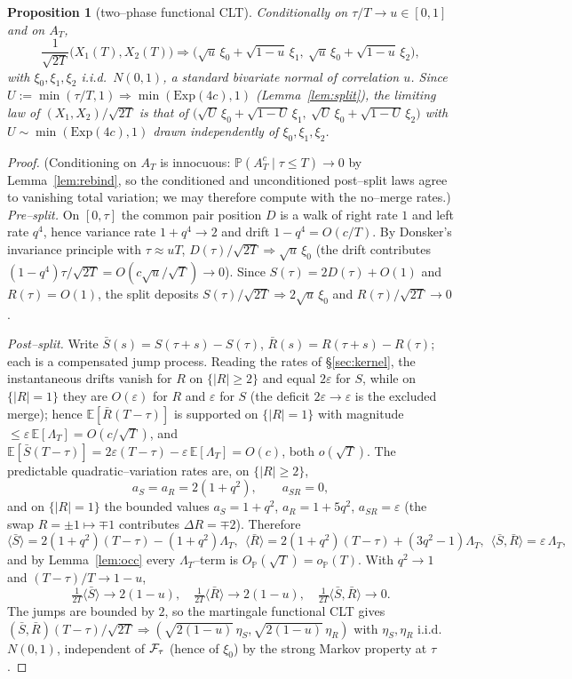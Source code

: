 \documentclass[11pt]{article}
\theoremstyle{plain}
\newtheorem{proposition}[theorem]{Proposition}
\theoremstyle{definition}
\theoremstyle{remark}
\newcommand{\E}{\mathbb{E}}\newcommand{\PP}{\mathbb{P}}\newcommand{\dd}{\,\mathrm{d}}
\newcommand{\To}{\Rightarrow}\newcommand{\so}{\mathfrak{so}}
\newcommand{\eps}{\varepsilon}\newcommand{\Exp}{\mathrm{Exp}}
\begin{document}
\begin{proposition}[two--phase functional CLT]\label{prop:twophase}
Conditionally on $\tau/T\to u\in[0,1]$ and on $A_T$,
\[
  \frac1{\sqrt{2T}}\big(X_1(T),X_2(T)\big)\To
  \big(\sqrt u\,\xi_0+\sqrt{1-u}\,\xi_1,\ \sqrt u\,\xi_0+\sqrt{1-u}\,\xi_2\big),
\]
with $\xi_0,\xi_1,\xi_2$ i.i.d.\ $N(0,1)$, a standard bivariate normal of correlation $u$.
Since $U:=\min(\tau/T,1)\To\min(\Exp(4c),1)$ (Lemma~\ref{lem:split}), the limiting law of
$(X_1,X_2)/\sqrt{2T}$ is that of
$\big(\sqrt U\,\xi_0+\sqrt{1-U}\,\xi_1,\ \sqrt U\,\xi_0+\sqrt{1-U}\,\xi_2\big)$ with
$U\sim\min(\Exp(4c),1)$ drawn independently of $\xi_0,\xi_1,\xi_2$.
\end{proposition}
\begin{proof}
(Conditioning on $A_T$ is innocuous: $\PP(A_T^c\mid\tau\le T)\to0$ by
Lemma~\ref{lem:rebind}, so the conditioned and unconditioned post--split laws agree
to vanishing total variation; we may therefore compute with the no--merge rates.)
\emph{Pre--split.} On $[0,\tau]$ the common pair position $D$ is a walk of right rate
$1$ and left rate $q^4$, hence variance rate $1+q^4\to2$ and drift $1-q^4=O(c/T)$. By
Donsker's invariance principle with $\tau\approx uT$, $D(\tau)/\sqrt{2T}\To\sqrt u\,\xi_0$
(the drift contributes $(1-q^4)\tau/\sqrt{2T}=O(c\sqrt u/\sqrt T)\to0$). Since
$S(\tau)=2D(\tau)+O(1)$ and $R(\tau)=O(1)$, the split deposits
$S(\tau)/\sqrt{2T}\To2\sqrt u\,\xi_0$ and $R(\tau)/\sqrt{2T}\to0$.

\emph{Post--split.} Write $\bar S(s)=S(\tau{+}s)-S(\tau)$, $\bar R(s)=R(\tau{+}s)-R(\tau)$;
each is a compensated jump process. Reading the rates of \S\ref{sec:kernel}, the
instantaneous drifts vanish for $R$ on $\{|R|\ge2\}$ and equal $2\eps$ for $S$, while on
$\{|R|=1\}$ they are $O(\eps)$ for $R$ and $\eps$ for $S$ (the deficit $2\eps\to\eps$ is
the excluded merge); hence $\E[\bar R(T{-}\tau)]$ is supported on $\{|R|=1\}$ with
magnitude $\le\eps\,\E[\Lambda_T]=O(c/\sqrt T)$, and
$\E[\bar S(T{-}\tau)]=2\eps(T{-}\tau)-\eps\,\E[\Lambda_T]=O(c)$, both $o(\sqrt T)$. The
predictable quadratic--variation rates are, on $\{|R|\ge2\}$,
\[
  a_S=a_R=2(1+q^2),\qquad a_{SR}=0,
\]
and on $\{|R|=1\}$ the bounded values $a_S=1+q^2$, $a_R=1+5q^2$, $a_{SR}=\eps$ (the swap
$R=\pm1\mapsto\mp1$ contributes $\Delta R=\mp2$). Therefore
\[
  \langle\bar S\rangle=2(1+q^2)(T{-}\tau)-(1+q^2)\Lambda_T,\ \
  \langle\bar R\rangle=2(1+q^2)(T{-}\tau)+(3q^2{-}1)\Lambda_T,\ \
  \langle\bar S,\bar R\rangle=\eps\,\Lambda_T,
\]
and by Lemma~\ref{lem:occ} every $\Lambda_T$--term is $O_\PP(\sqrt T)=o_\PP(T)$. With
$q^2\to1$ and $(T{-}\tau)/T\to1-u$,
\[
  \tfrac1{2T}\langle\bar S\rangle\to2(1-u),\quad
  \tfrac1{2T}\langle\bar R\rangle\to2(1-u),\quad
  \tfrac1{2T}\langle\bar S,\bar R\rangle\to0.
\]
The jumps are bounded by $2$, so the martingale functional CLT
\cite[Thm.~7.1.4]{EK} gives $(\bar S,\bar R)(T{-}\tau)/\sqrt{2T}\To
(\sqrt{2(1-u)}\,\eta_S,\sqrt{2(1-u)}\,\eta_R)$ with $\eta_S,\eta_R$ i.i.d.\ $N(0,1)$,
independent of $\mathcal F_\tau$ (hence of $\xi_0$) by the strong Markov property at $\tau$.


\end{proof}
\end{document}
